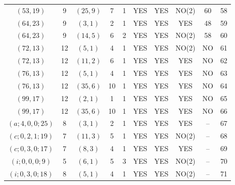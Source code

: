 \begin{longtable}{|c|c|c|c|c|c|c|c|c|c|}
$(53, 19)$ & 9 & $(25, 9)$ & 7 & 1 & YES & YES & NO(2) & 60 & 58\\
$(64, 23)$ & 9 & $(3, 1)$ & 2 & 1 & YES & YES & YES & 48 & 59\\
$(64, 23)$ & 9 & $(14, 5)$ & 6 & 2 & YES & YES & NO(2) & 58 & 60\\
$(72, 13)$ & 12 & $(5, 1)$ & 4 & 1 & YES & YES & NO(2) & NO & 61\\
$(72, 13)$ & 12 & $(11, 2)$ & 6 & 1 & YES & YES & YES & NO & 62\\
$(76, 13)$ & 12 & $(5, 1)$ & 4 & 1 & YES & YES & YES & NO & 63\\
$(76, 13)$ & 12 & $(35, 6)$ & 10 & 1 & YES & YES & YES & NO & 64\\
$(99, 17)$ & 12 & $(2, 1)$ & 1 & 1 & YES & YES & YES & NO & 65\\
$(99, 17)$ & 12 & $(35, 6)$ & 10 & 1 & YES & YES & YES & NO & 66\\
$(a; 4, 0, 0; 25)$ & 8 & $(3, 1)$ & 2 & 1 & YES & YES & YES & -- & 67\\
$(c; 0, 2, 1; 19)$ & 7 & $(11, 3)$ & 5 & 1 & YES & YES & NO(2) & -- & 68\\
$(c; 0, 3, 0; 17)$ & 7 & $(8, 3)$ & 4 & 1 & YES & YES & YES & -- & 69\\
$(i; 0, 0, 0; 9)$ & 5 & $(6, 1)$ & 5 & 3 & YES & YES & NO(2) & -- & 70\\
$(i; 0, 3, 0; 18)$ & 8 & $(5, 1)$ & 4 & 1 & YES & YES & NO(2) & -- & 71
\end{longtable}
